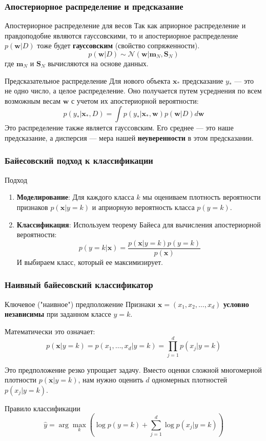 \documentclass[notheorems, handout]{beamer}
\newcommand{\vect}[1]{\mathbf{#1}}
\newcommand{\matr}[1]{\boldsymbol{#1}}
\begin{document}
\begin{frame}
  \frametitle{Апостериорное распределение и предсказание}
  \begin{block}{Апостериорное распределение для весов}
    Так как априорное распределение и правдоподобие являются гауссовскими, то и апостериорное распределение $p(\vect{w}|D)$ тоже будет \textbf{гауссовским} (свойство сопряженности).
    $$ p(\vect{w}|D) \sim \mathcal{N}(\vect{w} | \vect{m}_N, \matr{S}_N) $$
    где $\vect{m}_N$ и $\matr{S}_N$ вычисляются на основе данных.
  \end{block}
  
  \begin{block}{Предсказательное распределение}
    Для нового объекта $\vect{x}_*$ предсказание $y_*$ --- это не одно число, а целое распределение. Оно получается путем усреднения по всем возможным весам $\vect{w}$ с учетом их апостериорной вероятности:
    $$ p(y_*|\vect{x}_*, D) = \int p(y_*|\vect{x}_*, \vect{w}) p(\vect{w}|D) d\vect{w} $$
    Это распределение также является гауссовским. Его среднее --- это наше предсказание, а дисперсия --- мера нашей \textbf{неуверенности} в этом предсказании.
  \end{block}
\end{frame}

\begin{frame}
  \frametitle{Байесовский подход к классификации} 
  \begin{block}{Подход}
    \begin{enumerate}
      \item \textbf{Моделирование}: Для каждого класса $k$ мы оцениваем плотность вероятности признаков $p(\vect{x}|y=k)$ и априорную вероятность класса $p(y=k)$.
      \item \textbf{Классификация}: Используем теорему Байеса для вычисления апостериорной вероятности:
      $$ p(y=k|\vect{x}) = \frac{p(\vect{x}|y=k) p(y=k)}{p(\vect{x})} $$
      И выбираем класс, который ее максимизирует.
    \end{enumerate}
  \end{block}
\end{frame}
\begin{frame}
  \frametitle{Наивный байесовский классификатор}
  \begin{block}{Ключевое ("наивное") предположение}
  Признаки $\vect{x} = (x_1, x_2, \dots, x_d)$ \textbf{условно независимы} при заданном классе $y=k$.
  \end{block}
  Математически это означает:
  $$ p(\vect{x}|y=k) = p(x_1, \dots, x_d|y=k) = \prod_{j=1}^{d} p(x_j|y=k) $$
  
  Это предположение резко упрощает задачу. Вместо оценки сложной многомерной плотности $p(\vect{x}|y=k)$, нам нужно оценить $d$ одномерных плотностей $p(x_j|y=k)$.
  
  \begin{block}{Правило классификации}
  $$ \hat{y} = \arg\max_k \left( \log p(y=k) + \sum_{j=1}^{d} \log p(x_j|y=k) \right) $$
  \end{block}
\end{frame}
\end{document}
